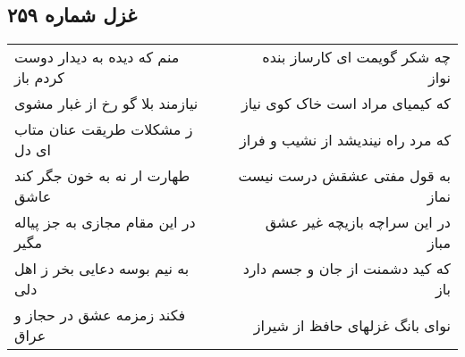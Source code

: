 \begin{center}
\section*{غزل شماره ۲۵۹}
\label{sec:sh259}
\begin{longtable}{l p{0.5cm} r}
منم که دیده به دیدار دوست کردم باز
&&
چه شکر گویمت ای کارساز بنده نواز
\\
نیازمند بلا گو رخ از غبار مشوی
&&
که کیمیای مراد است خاک کوی نیاز
\\
ز مشکلات طریقت عنان متاب ای دل
&&
که مرد راه نیندیشد از نشیب و فراز
\\
طهارت ار نه به خون جگر کند عاشق
&&
به قول مفتی عشقش درست نیست نماز
\\
در این مقام مجازی به جز پیاله مگیر
&&
در این سراچه بازیچه غیر عشق مباز
\\
به نیم بوسه دعایی بخر ز اهل دلی
&&
که کید دشمنت از جان و جسم دارد باز
\\
فکند زمزمه عشق در حجاز و عراق
&&
نوای بانگ غزلهای حافظ از شیراز
\\
\end{longtable}
\end{center}
